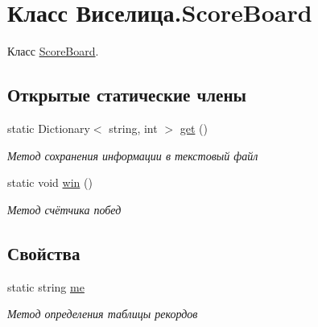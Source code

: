 \hypertarget{class_xD0_x92_xD0_xB8_xD1_x81_xD0_xB5_xD0_xBB_xD0_xB8_xD1_x86_xD0_xB0_1_1_score_board}{\section{Класс Виселица.\+Score\+Board}
\label{class_xD0_x92_xD0_xB8_xD1_x81_xD0_xB5_xD0_xBB_xD0_xB8_xD1_x86_xD0_xB0_1_1_score_board}
}


Класс \hyperlink{class_xD0_x92_xD0_xB8_xD1_x81_xD0_xB5_xD0_xBB_xD0_xB8_xD1_x86_xD0_xB0_1_1_score_board}{Score\+Board}.  


\subsection*{Открытые статические члены}
\begin{DoxyCompactItemize}
\item 
static Dictionary$<$ string, int $>$ \hyperlink{class_xD0_x92_xD0_xB8_xD1_x81_xD0_xB5_xD0_xBB_xD0_xB8_xD1_x86_xD0_xB0_1_1_score_board_aa37747677c15754cede71ca1f463106f}{get} ()
\begin{DoxyCompactList}\small\item\em Метод сохранения информации в текстовый файл \end{DoxyCompactList}\item 
static void \hyperlink{class_xD0_x92_xD0_xB8_xD1_x81_xD0_xB5_xD0_xBB_xD0_xB8_xD1_x86_xD0_xB0_1_1_score_board_a0c72ad34ad7743d96ad87813c3e96fd1}{win} ()
\begin{DoxyCompactList}\small\item\em Метод счётчика побед \end{DoxyCompactList}\end{DoxyCompactItemize}
\subsection*{Свойства}
\begin{DoxyCompactItemize}
\item 
static string \hyperlink{class_xD0_x92_xD0_xB8_xD1_x81_xD0_xB5_xD0_xBB_xD0_xB8_xD1_x86_xD0_xB0_1_1_score_board_ad744d39c7bc2c4b7f126dfdd4c68b92c}{me}
\begin{DoxyCompactList}\small\item\em Метод определения таблицы рекордов \end{DoxyCompactList}\end{DoxyCompactItemize}


